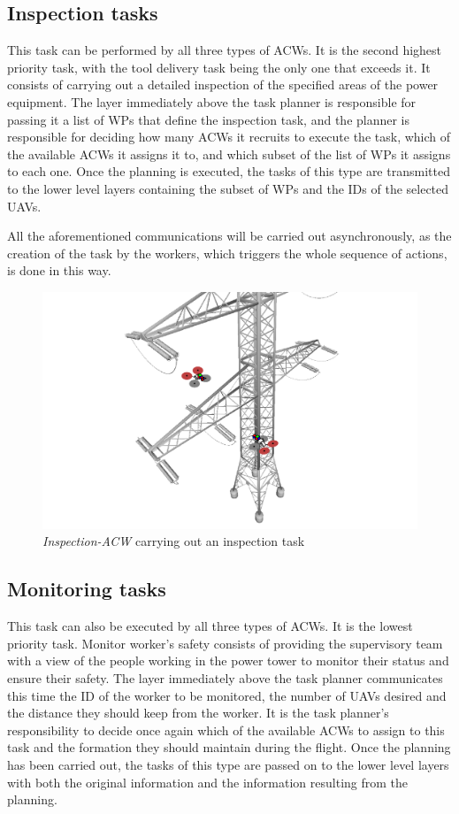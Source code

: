 \subsection{Inspection tasks}
\label{subsec:InspectionTasks}
This task can be performed by all three types of \glspl{ACW}. It is the second highest priority task, with the tool delivery task being the only one that exceeds it. It consists of carrying out a detailed inspection of the specified areas of the power equipment. The layer immediately above the task planner is responsible for passing it a list of \glspl{WP} that define the inspection task, and the planner is responsible for deciding how many \glspl{ACW} it recruits to execute the task, which of the available \glspl{ACW} it assigns it to, and which subset of the list of \glspl{WP} it assigns to each one. Once the planning is executed, the tasks of this type are transmitted to the lower level layers containing the subset of \glspl{WP} and the \glspl{ID} of the selected \glspl{UAV}.

All the aforementioned communications will be carried out asynchronously, as the creation of the task by the workers, which triggers the whole sequence of actions, is done in this way.

\begin{figure}[htbp]
    \centering
    \includegraphics[width=.75\linewidth]
    {ProblemFormulation/figures/inspection_task.pdf}
    \caption{\textit{Inspection-ACW} carrying out an inspection task}
    \label{fig:inspection_task}
\end{figure}

\subsection{Monitoring tasks}
\label{subsec:MonitoringTasks}
This task can also be executed by all three types of \glspl{ACW}. It is the lowest priority task. Monitor worker's safety consists of providing the supervisory team with a view of the people working in the power tower to monitor their status and ensure their safety. The layer immediately above the task planner communicates this time the \gls{ID} of the worker to be monitored, the number of \glspl{UAV} desired and the distance they should keep from the worker. It is the task planner's responsibility to decide once again which of the available \glspl{ACW} to assign to this task and the formation they should maintain during the flight. Once the planning has been carried out, the tasks of this type are passed on to the lower level layers with both the original information and the information resulting from the planning.

